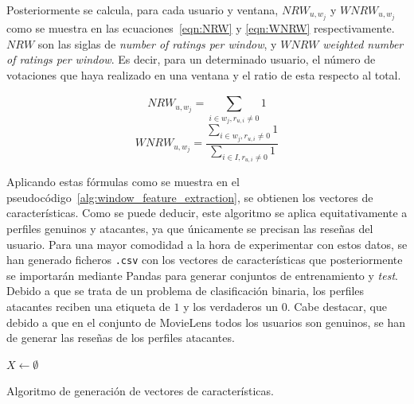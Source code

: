 Posteriormente se calcula, para cada usuario y ventana, $NRW_{u, w_j}$ y  $WNRW_{u, w_j}$ como se muestra en las ecuaciones~\ref{eqn:NRW} y \ref{eqn:WNRW} respectivamente. $NRW$ son las siglas de \textit{number of ratings per window}, y $WNRW$ \textit{weighted number of ratings per window}. Es decir, para un determinado usuario, el número de votaciones que haya realizado en una ventana y el ratio de esta respecto al total.

\begin{equation}\label{eqn:NRW} NRW_{u, w_j} = \sum_{i\in w_j, r_{u,i} \ne 0}^{} 1 \end{equation}
\begin{equation}\label{eqn:WNRW} WNRW_{u, w_j} = \frac{\sum_{i\in w_j, r_{u,i} \ne 0}^{} 1}{\sum_{i\in I, r_{u,i} \ne 0}^{} 1} \end{equation}

Aplicando estas fórmulas como se muestra en el pseudocódigo~\ref{alg:window_feature_extraction}, se obtienen los vectores de características. Como se puede deducir, este algoritmo se aplica equitativamente a perfiles genuinos y atacantes, ya que únicamente se precisan las reseñas del usuario. Para una mayor comodidad a la hora de experimentar con estos datos, se han generado ficheros \texttt{.csv} con los vectores de características que posteriormente se importarán mediante Pandas para generar conjuntos de entrenamiento y \textit{test}. Debido a que se trata de un problema de clasificación binaria, los perfiles atacantes reciben una etiqueta de $1$ y los verdaderos un $0$. Cabe destacar, que debido a que en el conjunto de MovieLens todos los usuarios son genuinos, se han de generar las reseñas de los perfiles atacantes. 

\begin{algorithm}
	\BlankLine
	$X \leftarrow \emptyset$\\
	\caption{Algoritmo de generación de vectores de características.}
	\label{alg:window_feature_extraction}
\end{algorithm}


